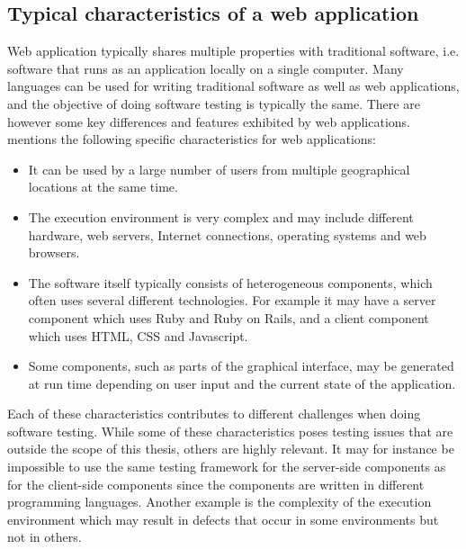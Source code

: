 \MakeShortVerb{\|}

\label{sec:testing_web}

\subsection{Typical characteristics of a web application}

Web application typically shares multiple properties with traditional
software, i.e. software that runs as an application locally on a single
computer. Many languages can be used for writing traditional software as
well as web applications, and the objective of doing software testing is
typically the same. There are however some key differences and features
exhibited by web applications. \citet{book:web} mentions the following
specific characteristics for web applications:\\

\begin{itemize}

\item It can be used by a large number of users from multiple
geographical locations at the same time.

\item The execution environment is very complex and may include
different hardware, web servers, Internet connections, operating systems
and web browsers.

\item The software itself typically consists of heterogeneous
components, which often uses several different technologies. For example
it may have a server component which uses Ruby and Ruby on Rails, and a
client component which uses HTML, CSS and Javascript.

\item Some components, such as parts of the graphical interface, may be
generated at run time depending on user input and the current state of
the application.

\end{itemize}

Each of these characteristics contributes to different challenges when
doing software testing. While some of these characteristics poses
testing issues that are outside the scope of this thesis, others are
highly relevant. It may for instance be impossible to use the same
testing framework for the server-side components as for the client-side
components since the components are written in different programming
languages. Another example is the complexity of the execution
environment which may result in defects that occur in some environments
but not in others.\\


